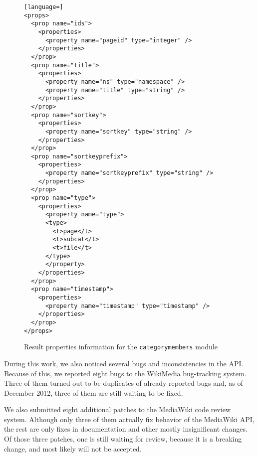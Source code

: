 \begin{figure}[p]

\begin{lstlisting}[language=]
<props>
  <prop name="ids">
    <properties>
      <property name="pageid" type="integer" />
    </properties>
  </prop>
  <prop name="title">
    <properties>
      <property name="ns" type="namespace" />
      <property name="title" type="string" />
    </properties>
  </prop>
  <prop name="sortkey">
    <properties>
      <property name="sortkey" type="string" />
    </properties>
  </prop>
  <prop name="sortkeyprefix">
    <properties>
      <property name="sortkeyprefix" type="string" />
    </properties>
  </prop>
  <prop name="type">
    <properties>
      <property name="type">
      <type>
        <t>page</t>
        <t>subcat</t>
        <t>file</t>
      </type>
      </property>
    </properties>
  </prop>
  <prop name="timestamp">
    <properties>
      <property name="timestamp" type="timestamp" />
    </properties>
  </prop>
</props>
\end{lstlisting}

\caption{Result properties information for the \texttt{categorymembers} module}
\label{paraminfo props}
\end{figure}

During this work, we also noticed several bugs and inconsistencies in the \ac{API}.
Because of this, we reported eight bugs to the WikiMedia bug-tracking system.
Three of them turned out to be duplicates of already reported bugs and,
as of December 2012, three of them are still waiting to be fixed.

We also submitted eight additional patches to the MediaWiki code review system.
Although only three of them actually fix behavior of the MediaWiki \ac{API},
the rest are only fixes in documentation and other mostly insignificant changes.
Of those three patches, one is still waiting for review, because it is a breaking change,
and most likely will not be accepted.